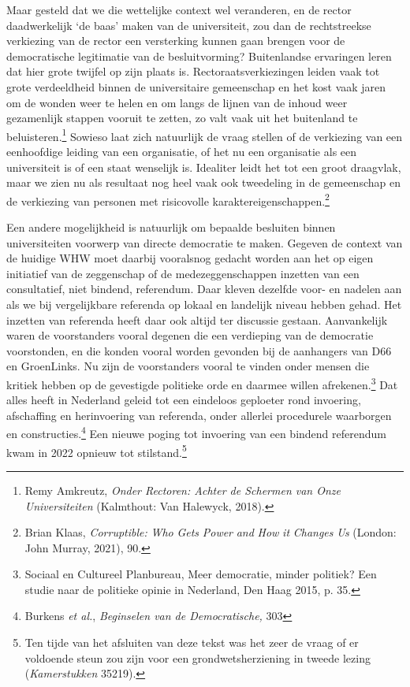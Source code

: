 \documentclass[smallauthor, chapterhaspagenum, nochapterinheader, pagenuminheader,  bigchapnum,medium2, tocpages,  garamond, titleinheader]{jote-book}
\begin{document}
	Maar gesteld dat we die wettelijke context wel veranderen, en de rector daadwerkelijk ‘de baas' maken van de universiteit, zou dan de rechtstreekse verkiezing van de rector een versterking kunnen gaan brengen voor de democratische legitimatie van de besluitvorming? Buitenlandse ervaringen leren dat hier grote twijfel op zijn plaats is. Rectoraatsverkiezingen leiden vaak tot grote verdeeldheid binnen de universitaire gemeenschap en het kost vaak jaren om de wonden weer te helen en om langs de lijnen van de inhoud weer gezamenlijk stappen vooruit te zetten, zo valt vaak uit het buitenland te beluisteren.\footnote{Remy Amkreutz, \emph{Onder Rectoren: Achter de Schermen van Onze Universiteiten}\emph{ }(Kalmthout: Van Halewyck, 2018).} Sowieso laat zich natuurlijk de vraag stellen of de verkiezing van een eenhoofdige leiding van een organisatie, of het nu een organisatie als een universiteit is of een staat wenselijk is. Idealiter leidt het tot een groot draagvlak, maar we zien nu als resultaat nog heel vaak ook tweedeling in de gemeenschap en de verkiezing van personen met risicovolle karaktereigenschappen.\footnote{Brian Klaas, \emph{Corruptible}\emph{: }\emph{Who}\emph{ }\emph{Gets}\emph{ Power }\emph{and}\emph{ How }\emph{it}\emph{ Changes }\emph{Us}\emph{ }(London: John Murray, 2021), 90.}



	Een andere mogelijkheid is natuurlijk om bepaalde besluiten binnen universiteiten voorwerp van directe democratie te maken. Gegeven de context van de huidige WHW moet daarbij vooralsnog gedacht worden aan het op eigen initiatief van de zeggenschap of de medezeggenschappen inzetten van een consultatief, niet bindend, referendum. Daar kleven dezelfde voor- en nadelen aan als we bij vergelijkbare referenda op lokaal en landelijk niveau hebben gehad. Het inzetten van referenda heeft daar ook altijd ter discussie gestaan. Aanvankelijk waren de voorstanders vooral degenen die een verdieping van de democratie voorstonden, en die konden vooral worden gevonden bij de aanhangers van D66 en GroenLinks. Nu zijn de voorstanders vooral te vinden onder mensen die kritiek hebben op de gevestigde politieke orde en daarmee willen afrekenen.\footnote{Sociaal en Cultureel Planbureau, Meer democratie, minder politiek? Een studie naar de politieke opinie in Nederland, Den Haag 2015, p. 35. } Dat alles heeft in Nederland geleid tot een eindeloos geploeter rond invoering, afschaffing en herinvoering van referenda, onder allerlei procedurele waarborgen en constructies.\footnote{Burkens \emph{et al.}, \emph{Beginselen van de Democratische, }303} Een nieuwe poging tot invoering van een bindend referendum kwam in 2022 opnieuw tot stilstand.\footnote{Ten tijde van het afsluiten van deze tekst was het zeer de vraag of er voldoende steun zou zijn voor een grondwetsherziening in tweede lezing (\emph{Kamerstukken} 35219).}
\end{document}
